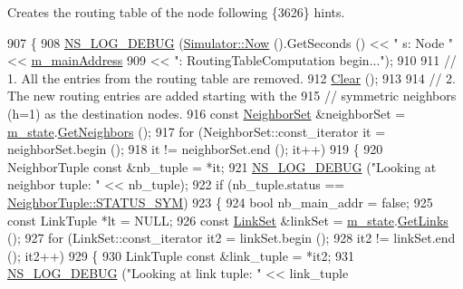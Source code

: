 Creates the routing table of the node following \{3626\} hints. 


\begin{DoxyCode}
907 \{
908   \hyperlink{group__logging_ga413f1886406d49f59a6a0a89b77b4d0a}{NS\_LOG\_DEBUG} (\hyperlink{classns3_1_1Simulator_ac3178fa975b419f7875e7105be122800}{Simulator::Now} ().GetSeconds () << \textcolor{stringliteral}{" s: Node "} << 
      \hyperlink{classns3_1_1olsr_1_1RoutingProtocol_a58cc50ed5d1039aab603e90e318aabfb}{m\_mainAddress}
909                                                 << \textcolor{stringliteral}{": RoutingTableComputation begin..."});
910 
911   \textcolor{comment}{// 1. All the entries from the routing table are removed.}
912   \hyperlink{classns3_1_1olsr_1_1RoutingProtocol_a91a0babaefcd493c649fceb4fb1a2e60}{Clear} ();
913 
914   \textcolor{comment}{// 2. The new routing entries are added starting with the}
915   \textcolor{comment}{// symmetric neighbors (h=1) as the destination nodes.}
916   \textcolor{keyword}{const} \hyperlink{namespacens3_1_1olsr_af0afef1f28c6f0a0b528b03b638df05d}{NeighborSet} &neighborSet = \hyperlink{classns3_1_1olsr_1_1RoutingProtocol_a07942ec1a7df71b609c8d2ff3b567c49}{m\_state}.\hyperlink{classns3_1_1olsr_1_1OlsrState_a82d5882ca3fdb93a9c1110c6f176c03c}{GetNeighbors} ();
917   \textcolor{keywordflow}{for} (NeighborSet::const\_iterator it = neighborSet.begin ();
918        it != neighborSet.end (); it++)
919     \{
920       NeighborTuple \textcolor{keyword}{const} &nb\_tuple = *it;
921       \hyperlink{group__logging_ga413f1886406d49f59a6a0a89b77b4d0a}{NS\_LOG\_DEBUG} (\textcolor{stringliteral}{"Looking at neighbor tuple: "} << nb\_tuple);
922       \textcolor{keywordflow}{if} (nb\_tuple.status == \hyperlink{structns3_1_1olsr_1_1NeighborTuple_ad4b623edaedb3a5244291c738ce87e12a1649b9e4d61ac6e27eff65e8bd5dfe15}{NeighborTuple::STATUS\_SYM})
923         \{
924           \textcolor{keywordtype}{bool} nb\_main\_addr = \textcolor{keyword}{false};
925           \textcolor{keyword}{const} LinkTuple *lt = NULL;
926           \textcolor{keyword}{const} \hyperlink{namespacens3_1_1olsr_a60381cc41d65a2e0daabd286077a378a}{LinkSet} &linkSet = \hyperlink{classns3_1_1olsr_1_1RoutingProtocol_a07942ec1a7df71b609c8d2ff3b567c49}{m\_state}.\hyperlink{classns3_1_1olsr_1_1OlsrState_a1d8f1a95165973f05e3fd1ff0d76fbda}{GetLinks} ();
927           \textcolor{keywordflow}{for} (LinkSet::const\_iterator it2 = linkSet.begin ();
928                it2 != linkSet.end (); it2++)
929             \{
930               LinkTuple \textcolor{keyword}{const} &link\_tuple = *it2;
931               \hyperlink{group__logging_ga413f1886406d49f59a6a0a89b77b4d0a}{NS\_LOG\_DEBUG} (\textcolor{stringliteral}{"Looking at link tuple: "} << link\_tuple

\end{DoxyCode}
